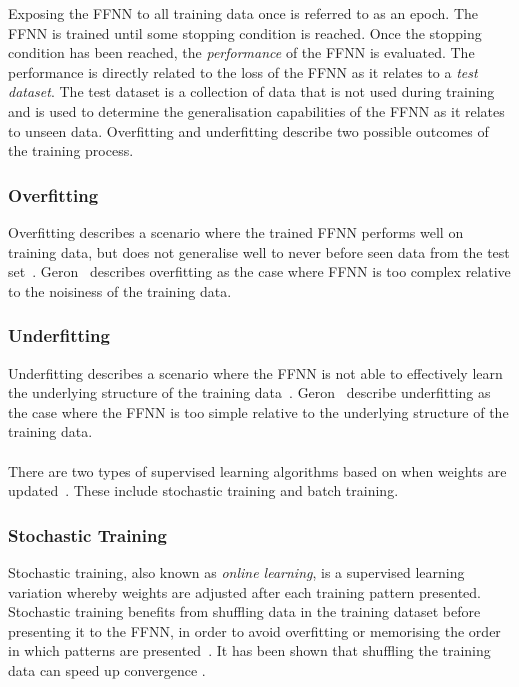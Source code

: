 Exposing the \acs{FFNN} to all training data once is referred to as an
epoch. The \acs{FFNN} is trained until some stopping condition is reached. Once the stopping condition has been reached, the \textit{performance} of the \acs{FFNN} is evaluated. The performance is directly related to the loss of the \acs{FFNN} as it relates to a \textit{test dataset}. The test dataset is a collection of data that is not used during training and is used to determine the generalisation capabilities of the \acs{FFNN} as it relates to unseen data. Overfitting and underfitting describe two possible outcomes of the training process.


\subsubsection{Overfitting}\label{sec:anns:training:process:overfitting}

Overfitting describes a scenario where the trained \acs{FFNN} performs well on training data, but does not generalise well to never before seen data from the test set~\cite{ref:tetko:1995, ref:geron:2017}. Geron~\cite{ref:geron:2017} describes overfitting as the case where \acs{FFNN} is too complex relative to the noisiness of the training data.

\subsubsection{Underfitting}\label{sec:anns:training:process:underfitting}

Underfitting describes a scenario where the \acs{FFNN} is not able to effectively learn the underlying structure of the training data~\cite{ref:tetko:1995, ref:geron:2017}. Geron~\cite{ref:geron:2017} describe underfitting as the case where the \acs{FFNN} is too simple relative to the underlying structure of the training data.\\
\\
\noindent
There are two types of supervised learning algorithms based on when weights are updated~\cite{ref:engelbrecht:2007}. These include stochastic training and batch
training.


\subsubsection{Stochastic Training}\label{sec:anns:training:stochastic}

Stochastic training, also known as \textit{online learning}, is a supervised learning variation whereby weights are adjusted after each training pattern presented. Stochastic training benefits from shuffling data in the training dataset before presenting it to the \acs{FFNN}, in order to avoid overfitting or memorising the order in which patterns are presented~\cite{ref:engelbrecht:2007}. It has been shown that shuffling the training data can speed up convergence
\cite{ref:bengio:2012}.


